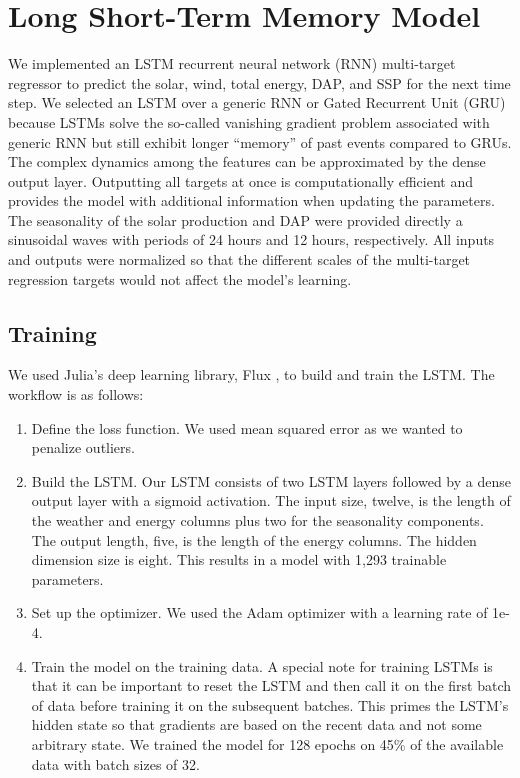 \documentclass[
  journal,
]{IEEEtran}%
\providecommand{\tightlist}{%
  \setlength{\itemsep}{0pt}\setlength{\parskip}{0pt}}\usepackage{longtable,booktabs,array}
\begin{document}
\section{Long Short-Term Memory
Model}\label{long-short-term-memory-model}

We implemented an LSTM recurrent neural network (RNN) multi-target
regressor to predict the solar, wind, total energy, DAP, and SSP for the
next time step. We selected an LSTM over a generic RNN or Gated
Recurrent Unit (GRU) because LSTMs solve the so-called vanishing
gradient problem associated with generic RNN but still exhibit longer
``memory'' of past events compared to GRUs. The complex dynamics among
the features can be approximated by the dense output layer. Outputting
all targets at once is computationally efficient and provides the model
with additional information when updating the parameters. The
seasonality of the solar production and DAP were provided directly a
sinusoidal waves with periods of 24 hours and 12 hours, respectively.
All inputs and outputs were normalized so that the different scales of
the multi-target regression targets would not affect the model's
learning.

\subsection{Training}\label{training}

We used Julia's deep learning library, Flux
, to build and train the LSTM. The
workflow is as follows:

\begin{enumerate}
\def\labelenumi{\arabic{enumi}.}
\tightlist
\item
  Define the loss function. We used mean squared error as we wanted to
  penalize outliers.
\item
  Build the LSTM. Our LSTM consists of two LSTM layers followed by a
  dense output layer with a sigmoid activation. The input size, twelve,
  is the length of the weather and energy columns plus two for the
  seasonality components. The output length, five, is the length of the
  energy columns. The hidden dimension size is eight. This results in a
  model with 1,293 trainable parameters.
\item
  Set up the optimizer. We used the Adam optimizer with a learning rate
  of 1e-4.
\item
  Train the model on the training data. A special note for training
  LSTMs is that it can be important to reset the LSTM and then call it
  on the first batch of data before training it on the subsequent
  batches. This primes the LSTM's hidden state so that gradients are
  based on the recent data and not some arbitrary state. We trained the
  model for 128 epochs on 45\% of the available data with batch sizes of
  32.
\end{enumerate}
\end{document}
